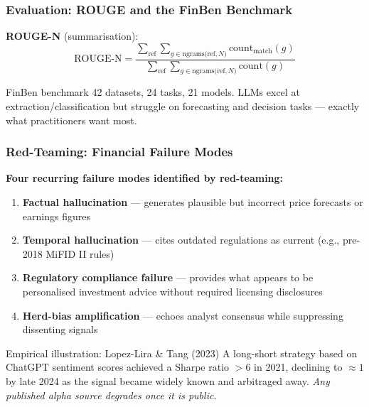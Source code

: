 \documentclass[9pt,t]{beamer}
\begin{document}
\begin{frame}
\frametitle{Evaluation: ROUGE and the FinBen Benchmark}

\textbf{ROUGE-N} (summarisation):
\[
  \text{ROUGE-N} = \frac{\displaystyle\sum_{\text{ref}}\sum_{g \in \text{ngrams(ref},N)} \text{count}_\text{match}(g)}
                        {\displaystyle\sum_{\text{ref}}\sum_{g \in \text{ngrams(ref},N)} \text{count}(g)}
\]

\medskip
\begin{block}{FinBen benchmark}
  42 datasets, 24 tasks, 21 models. LLMs excel at extraction/classification but
  struggle on forecasting and decision tasks --- exactly what practitioners want most.
\end{block}
\end{frame}

\begin{frame}
\frametitle{Red-Teaming: Financial Failure Modes}

\textbf{Four recurring failure modes identified by red-teaming:}

\begin{enumerate}
  \item \textbf{Factual hallucination} --- generates plausible but incorrect price
        forecasts or earnings figures
  \item \textbf{Temporal hallucination} --- cites outdated regulations as current
        (e.g., pre-2018 MiFID II rules)
  \item \textbf{Regulatory compliance failure} --- provides what appears to be
        personalised investment advice without required licensing disclosures
  \item \textbf{Herd-bias amplification} --- echoes analyst consensus while
        suppressing dissenting signals
\end{enumerate}

\medskip
\begin{block}{Empirical illustration: Lopez-Lira \& Tang (2023)}
  A long-short strategy based on ChatGPT sentiment scores achieved a Sharpe ratio
  $> 6$ in 2021, declining to $\approx 1$ by late 2024 as the signal became widely
  known and arbitraged away.
  \textit{Any published alpha source degrades once it is public.}
\end{block}
\end{frame}
\end{document}
